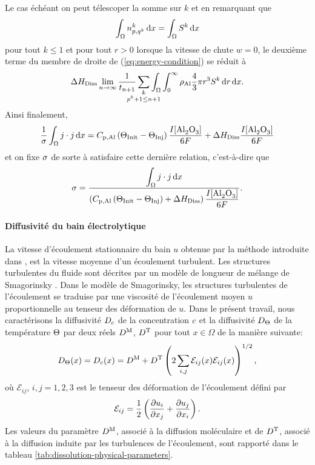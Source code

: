 Le cas échéant on peut télescoper la somme sur $k$ et en remarquant que
\begin{equation*}
  \int_\Omega n_{p,q^k}^k\,\mathrm dx = \int_\Omega S^k\,\mathrm dx
\end{equation*}
pour tout $k \leq 1$ et pour tout $r > 0$ lorsque la vitesse de chute
$w = 0$, le deuxième terme du membre de droite de
(\ref{eq:energy-condition}) se réduit à
\begin{equation*}
  {\aluminadissolutionenthalpy}\lim_{n\to\infty}\frac{1}{t_{n+1}}\sum_{\mathclap{\substack{k\\ p^k +
  1 \leq n + 1}}}\int_\Omega\int_0^\infty\aluminadensity
  \frac{4}{3}\pi r^3 S^k\intd{r}\intd{x}.
\end{equation*}
Ainsi finalement,
\begin{equation*}
  \frac{1}{\sigma}\int_\Omega j\cdot j\intd{x}
  =\aluminahc\parent{\tinit-\tinj}\frac{I[\cee{Al2O3}]}{6F} + {\aluminadissolutionenthalpy}\frac{I[\cee{Al2O3}]}{6F}
\end{equation*}
et on fixe $\sigma$ de sorte à satisfaire cette dernière
relation, c'est-à-dire que
\begin{equation}\label{eq:conductivity-condition}
  \conductivity = \frac{\displaystyle\int_\Omega j\cdot j\intd{x}}{\parent{\aluminahc\parent{\tinit-\tinj} + {\aluminadissolutionenthalpy} }
    \displaystyle\frac{I[\cee{Al2O3}]}{6F}}.
\end{equation}

\paragraph{Diffusivité du bain électrolytique} La vitesse d'écoulement
stationnaire du bain $u$ obtenue par la méthode introduite dans
\cite{Steiner2009}, \cite{Rochat2016} est la vitesse moyenne d'un
écoulement turbulent. Les structures turbulentes du fluide sont
décrites par un modèle de longueur de mélange de Smagorinsky
\cite{Rochat2016}. Dans le modèle de Smagorinsky, les structures
turbulentes de l'écoulement se traduise par une viscosité de
l'écoulement moyen $u$ proportionnelle au tenseur des déformation de
$u$. Dans le présent travail, nous caractérisons la diffusivité
$D_{c}$ de la concentration $c$ et la
diffusivité $D_\Theta$ de la température $\Theta$ par
deux réels $D^{\mathrm M}$, $D^{\mathrm T}$ pour tout
$x\in\Omega$ de la manière suivante:
\begin{align}
  D_\Theta(x) =  D_{c}(x) = D^{\mathrm M} +
  D^{\mathrm T}\left( 2\sum_{i,j}\mathcal E_{ij}(x)\mathcal E_{ij}(x) \right)^{1/2},
\end{align}
où $\mathcal E_{ij}$, $i, j = 1,2,3$ est le tenseur des déformation
de l'écoulement défini par
\begin{equation}
  \mathcal E_{ij} = \frac{1}{2}\left( \frac{\partial u_i}{\partial
      x_j} + \frac{\partial u_j}{\partial x_i} \right).
\end{equation}
Les valeurs du paramètre $D^{\mathrm M}$, associé à la diffusion
moléculaire et de $D^{\mathrm T}$, associé à la diffusion
induite par les turbulences de l'écoulement, sont rapporté dans le
tableau \ref{tab:dissolution-physical-parameters}.



